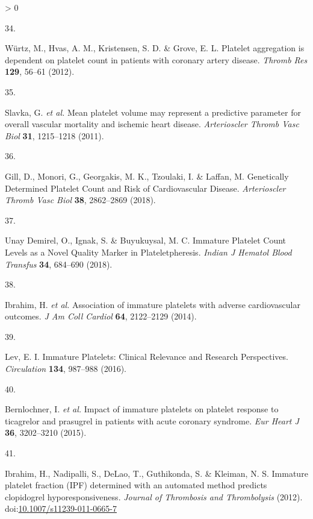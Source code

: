 \documentclass[11pt,twoside]{bristolthesis}
\newlength{\cslhangindent}
\newlength{\csllabelwidth}
\newenvironment{CSLReferences}[2] %
 {%
  \setlength{\parindent}{0pt}
  \ifodd #1 \everypar{\setlength{\hangindent}{\cslhangindent}}\ignorespaces\fi
  \ifnum #2 > 0
  \setlength{\parskip}{#2\baselineskip}
  \fi
 }%
 {}
\newcommand{\CSLLeftMargin}[1]{\parbox[t]{\csllabelwidth}{#1}}
\newcommand{\CSLRightInline}[1]{\parbox[t]{\linewidth - \csllabelwidth}{#1}\break}
\begin{document}
\begin{CSLReferences}{0}{0}
\leavevmode\hypertarget{ref-Wurtz2012}{}%
\CSLLeftMargin{34. }
\CSLRightInline{Würtz, M., Hvas, A. M., Kristensen, S. D. \& Grove, E. L. {Platelet aggregation is dependent on platelet count in patients with coronary artery disease}. \emph{Thromb Res} \textbf{129}, 56--61 (2012).}

\leavevmode\hypertarget{ref-Slavka2011}{}%
\CSLLeftMargin{35. }
\CSLRightInline{Slavka, G. \emph{et al.} {Mean platelet volume may represent a predictive parameter for overall vascular mortality and ischemic heart disease}. \emph{Arterioscler Thromb Vasc Biol} \textbf{31}, 1215--1218 (2011).}

\leavevmode\hypertarget{ref-Gill2018}{}%
\CSLLeftMargin{36. }
\CSLRightInline{Gill, D., Monori, G., Georgakis, M. K., Tzoulaki, I. \& Laffan, M. {Genetically Determined Platelet Count and Risk of Cardiovascular Disease}. \emph{Arterioscler Thromb Vasc Biol} \textbf{38}, 2862--2869 (2018).}

\leavevmode\hypertarget{ref-UnayDemirel2018a}{}%
\CSLLeftMargin{37. }
\CSLRightInline{Unay Demirel, O., Ignak, S. \& Buyukuysal, M. C. {Immature Platelet Count Levels as a Novel Quality Marker in Plateletpheresis}. \emph{Indian J Hematol Blood Transfus} \textbf{34}, 684--690 (2018).}

\leavevmode\hypertarget{ref-Ibrahim2014}{}%
\CSLLeftMargin{38. }
\CSLRightInline{Ibrahim, H. \emph{et al.} {Association of immature platelets with adverse cardiovascular outcomes}. \emph{J Am Coll Cardiol} \textbf{64}, 2122--2129 (2014).}

\leavevmode\hypertarget{ref-Lev2016a}{}%
\CSLLeftMargin{39. }
\CSLRightInline{Lev, E. I. {Immature Platelets: Clinical Relevance and Research Perspectives}. \emph{Circulation} \textbf{134}, 987--988 (2016).}

\leavevmode\hypertarget{ref-Bernlochner2015a}{}%
\CSLLeftMargin{40. }
\CSLRightInline{Bernlochner, I. \emph{et al.} {Impact of immature platelets on platelet response to ticagrelor and prasugrel in patients with acute coronary syndrome}. \emph{Eur Heart J} \textbf{36}, 3202--3210 (2015).}

\leavevmode\hypertarget{ref-Ibrahim2012}{}%
\CSLLeftMargin{41. }
\CSLRightInline{Ibrahim, H., Nadipalli, S., DeLao, T., Guthikonda, S. \& Kleiman, N. S. {Immature platelet fraction (IPF) determined with an automated method predicts clopidogrel hyporesponsiveness}. \emph{Journal of Thrombosis and Thrombolysis} (2012). doi:\href{https://doi.org/10.1007/s11239-011-0665-7}{10.1007/s11239-011-0665-7}}


\end{CSLReferences}
\end{document}
